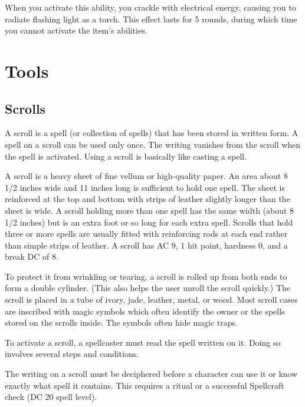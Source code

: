 When you activate this ability, you crackle with electrical energy, causing you to radiate flashing light as a torch. This effect lasts for 5 rounds, during which time you cannot activate the item's abilities.


\section{Tools}

\subsection{Scrolls}
A scroll is a spell (or collection of spells) that has been stored in written form. A spell on a scroll can be used only once. The writing vanishes from the scroll when the spell is activated. Using a scroll is basically like casting a spell.

 A scroll is a heavy sheet of fine vellum or high-quality paper. An area about 8 1/2 inches wide and 11 inches long is sufficient to hold one spell. The sheet is reinforced at the top and bottom with strips of leather slightly longer than the sheet is wide. A scroll holding more than one spell has the same width (about 8 1/2 inches) but is an extra foot or so long for each extra spell. Scrolls that hold three or more spells are usually fitted with reinforcing rods at each end rather than simple strips of leather. A scroll has AC 9, 1 hit point, hardness 0, and a break DC of 8.

To protect it from wrinkling or tearing, a scroll is rolled up from both ends to form a double cylinder. (This also helps the user unroll the scroll quickly.) The scroll is placed in a tube of ivory, jade, leather, metal, or wood. Most scroll cases are inscribed with magic symbols which often identify the owner or the spells stored on the scrolls inside. The symbols often hide magic traps.

 To activate a scroll, a spellcaster must read the spell written on it. Doing so involves several steps and conditions.

 The writing on a scroll must be deciphered before a character can use it or know exactly what spell it contains. This requires a  ritual or a successful Spellcraft check (DC 20 \add spell level).

